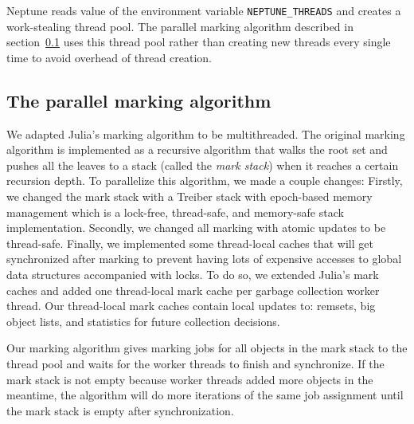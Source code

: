 Neptune reads value of the environment variable \texttt{NEPTUNE\_THREADS} and creates a work-stealing thread pool. The parallel marking algorithm described in section~\ref{marking_algo} uses this thread pool rather than creating new threads every single time to avoid overhead of thread creation.

\subsection{The parallel marking algorithm}
\label{marking_algo}
We adapted Julia's marking algorithm to be multithreaded. The original marking algorithm is implemented as a recursive algorithm that walks the root set and pushes all the leaves to a stack (called the \emph{mark stack}) when it reaches a certain recursion depth. To parallelize this algorithm, we made a couple changes: Firstly, we changed the mark stack with a Treiber stack \cite{???} with epoch-based memory management which is a lock-free, thread-safe, and memory-safe stack implementation. Secondly, we changed all marking with atomic updates to be thread-safe. Finally, we implemented some thread-local caches that will get synchronized after marking to prevent having lots of expensive accesses to global data structures accompanied with locks. To do so, we extended Julia's mark caches and added one thread-local mark cache per garbage collection worker thread. Our thread-local mark caches contain local updates to: remsets, big object lists, and statistics for future collection decisions.

Our marking algorithm gives marking jobs for all objects in the mark stack to the thread pool and waits for the worker threads to finish and synchronize. If the mark stack is not empty because worker threads added more objects in the meantime, the algorithm will do more iterations of the same job assignment until the mark stack is empty after synchronization.

